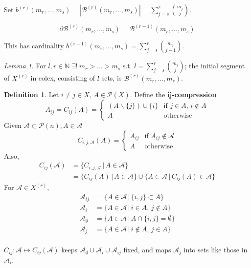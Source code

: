 \documentclass[a4paper]{article}
\theoremstyle{definition}
\newtheorem*{definition}{Definition}
\theoremstyle{remark}
\theoremstyle{default}
\newtheorem{lemma}[theorem]{Lemma}
\newcommand*\abs[1]{\left|#1\right|}
\begin{document}
Set $b^{(r)}(m_r, \dots, m_s) = \abs{\mathcal{B}^{(r)}(m_r, \dots, m_s)} = \sum_{j=s}^r {m_j \choose j}$.

$$\partial\mathcal{B}^{(r)}(m_r, \dots, m_s) = \mathcal{B}^{(r-1)}(m_r, \dots, m_s)$$

This has cardinality $b^{(r-1)}(m_r, \dots, m_s) = \sum_{j=s}^r {m_j \choose j-1}$.

\begin{lemma}
	For $l, r \in \mathbb{N}$ $\exists!\ m_r > \dots > m_s$  s.t. $l = \sum_{j=s}^r {m_j \choose j}$; the initial segment of $X^{(r)}$ in colex, consisting of $l$ sets, is $\mathcal{B}^{(r)}(m_r, \dots, m_s)$.
\end{lemma}

\begin{definition}
	Let $i \neq j \in X$, $A \in \mathcal{P}(X)$. Define the \textbf{ij-compression} $$A_{ij} = C_{ij}(A) = \begin{cases}
	(A\backslash \{j\}) \cup \{i\} & \text{if } j \in A,\, i \not\in A \\
	A & \text{otherwise}
	\end{cases}$$
	Given $\mathcal{A} \subset \mathcal{P}(n), A \in \mathcal{A}$ $$C_{i,j,\mathcal{A}}(A) = \begin{cases}
	A_{ij} & \text{if } A_{ij} \not\in \mathcal{A} \\
	A & \text{otherwise}
	\end{cases}$$
	Also,
	\begin{align*}
	C_{ij}(\mathcal{A}) &= \{C_{i,j,\mathcal{A}} \,|\, A \in \mathcal{A} \} \\
	&= \{C_{ij}(A) \,|\, A \in \mathcal{A}\} \cup \{A \in \mathcal{A} \,|\, C_{ij}(A) \in \mathcal{A}\}
	\end{align*}
	For $\mathcal{A} \in X^{(r)}$,
	\begin{align*}
	\mathcal{A}_{ij} &= \{A \in \mathcal{A} \,|\, \{i,j\} \subset A \} \\
	\mathcal{A}_i &= \{A \in \mathcal{A} \,|\, i \in A,\, j \not\in A \} \\
	\mathcal{A}_\emptyset &= \{A \in \mathcal{A} \,|\, A \cap \{i, j\} = \emptyset \} \\
	\mathcal{A}_j &= \{A \in \mathcal{A} \,|\, i \not\in A,\, j \in A \} \\
	\end{align*}
\end{definition}
$C_{ij}: \mathcal{A} \mapsto C_{ij}(\mathcal{A})$ keeps $\mathcal{A}_\emptyset \cup \mathcal{A}_i \cup \mathcal{A}_{ij}$ fixed, and maps $\mathcal{A}_j$ into sets like those in $\mathcal{A}_i$.
\end{document}
